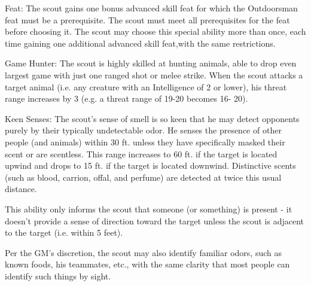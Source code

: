 \begin{description*}
\item[\hspace{1.5cm}Feat:] The scout gains one bonus advanced skill feat for which the Outdoorsman feat must be a prerequisite. The scout must meet all prerequisites for the feat before choosing it. The scout may choose this special ability more than once, each time gaining one additional advanced skill feat,with the same restrictions.
\item[\hspace{1.5cm}Game Hunter:] The scout is highly skilled at hunting animals, able to drop even largest game with just one ranged shot or melee strike. When the scout attacks a target animal (i.e. any creature with an Intelligence of 2 or lower), his threat range increases by 3 (e.g. a threat range of 19-20 becomes 16- 20).
\item[\hspace{1.5cm}Keen Senses:] The scout's sense of smell is so keen that he may detect opponents purely by their typically undetectable odor. He senses the presence of other people (and animals) within 30 ft. unless they have specifically masked their scent or are scentless. This range increases to 60 ft. if the target is located upwind and drops to 15 ft. if the target is located downwind. Distinctive scents (such as blood, carrion, offal, and perfume) are detected at twice this usual distance.

This ability only informs the scout that someone (or something) is present - it doesn't provide a sense of direction toward the target unless the scout is adjacent to the target (i.e. within 5 feet).

Per the GM's discretion, the scout may also identify familiar odors, such as known foods, his teammates, etc., with the same clarity that most people can identify such things by sight.


\end{description*}
